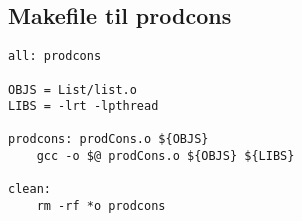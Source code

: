 \subsection{Makefile til prodcons}
\begin{lstlisting}
all: prodcons

OBJS = List/list.o
LIBS = -lrt -lpthread

prodcons: prodCons.o ${OBJS}
	gcc -o $@ prodCons.o ${OBJS} ${LIBS}
	
clean:
	rm -rf *o prodcons
\end{lstlisting}